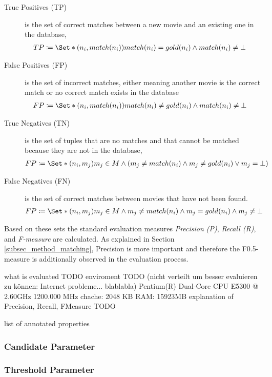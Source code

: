 \begin{description}
\item[True Positives (TP)] is the set of correct matches between a new movie and an existing one in the database,
\begin{align}
TP &\coloneqq \Set*{(n_i, match(n_i))}{match(n_i) = gold(n_i) \land match(n_i) \neq \bot}
\end{align}
\item[False Positives (FP)] is the set of incorrect matches, either meaning another movie is the correct match or no correct match exists in the database
\begin{align}
FP &\coloneqq \Set*{(n_i, match(n_i))}{match(n_i) \neq gold(n_i) \land match(n_i) \neq \bot}
\end{align}\item[True Negatives (TN)] is the set of tuples that are no matches and that cannot be matched because they are not in the database,
\begin{align}
FP &\coloneqq \Set*{(n_i, m_j)}{m_j \in M \land (m_j \neq match(n_i) \land m_j \neq gold(n_i) \lor m_j = \bot)}
\end{align}
\item[False Negatives (FN)] is the set of correct matches between movies that have not been found.
\begin{align}
FP &\coloneqq \Set*{(n_i, m_j)}{m_j \in M \land m_j \neq match(n_i) \land m_j = gold(n_i) \land m_j \neq \bot}
\end{align}
\end{description}

Based on these sets the standard evaluation measures \emph{Precision (P)}, \emph{Recall (R)}, and \emph{F-measure} are calculated.
As explained in Section \ref{subsec_method_matching}, Precision is more important and therefore the F0.5-measure is additionally observed in the evaluation process.

what is evaluated TODO
enviroment TODO (nicht verteilt um besser evaluieren zu können: Internet probleme... blablabla)
Pentium(R) Dual-Core  CPU      E5300  @ 2.60GHz
1200.000 MHz
chache: 2048 KB
RAM: 15923MB
explanation of Precision, Recall, FMeasure TODO

list of annotated properties 

\subsubsection{Candidate Parameter}
\subsubsection{Threshold Parameter}
